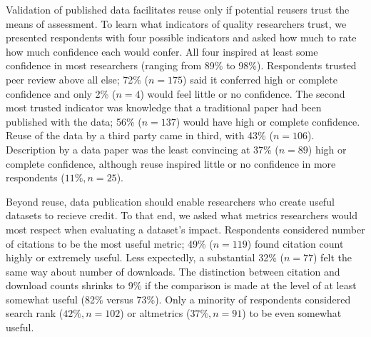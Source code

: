 \documentclass[10pt]{article}
\begin{document}
Validation of published data facilitates reuse only if potential reusers trust the means of assessment.
To learn what indicators of quality researchers trust, we presented respondents with four possible indicators and asked how much to rate how much confidence each would confer.
All four inspired at least some confidence in most researchers (ranging from 89\% to 98\%).
Respondents trusted peer review above all else; 72\% ($n=175$) said it conferred high or complete confidence and only 2\% ($n=4$) would feel little or no confidence.
The second most trusted indicator was knowledge that a traditional paper had been published with the data; 56\% ($n=137$) would have high or complete confidence.
Reuse of the data by a third party came in third, with 43\% ($n=106$). 
Description by a data paper was the least convincing at 37\% ($n=89$) high or complete confidence, although reuse inspired little or no confidence in more respondents ($11\%, n=25$).

Beyond reuse, data publication should enable researchers who create useful datasets to recieve credit.
To that end, we asked what metrics researchers would most respect when evaluating a dataset's impact.
Respondents considered number of citations to be the most useful metric; 49\% ($n=119$) found citation count highly or extremely useful. 
Less expectedly, a substantial 32\% ($n=77$) felt the same way about number of downloads.
The distinction between citation and download counts shrinks to 9\% if the comparison is made at the level of at least somewhat useful (82\% versus 73\%).
Only a minority of respondents considered search rank ($42\%, n=102$) or altmetrics ($37\%, n=91$) to be even somewhat useful.
\end{document}
